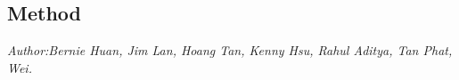 \subsection{Method} %
\textit{\footnotesize Author:Bernie Huan, Jim Lan, Hoang Tan, Kenny Hsu, Rahul Aditya, Tan Phat, Wei.}\\




\newpage %
